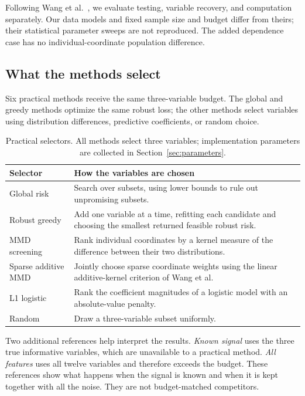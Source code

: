 \documentclass[11pt,a4paper]{article}
\begin{document}
Following Wang et al.~\cite{wang}, we evaluate testing, variable recovery, and
computation separately. Our data models and fixed sample size and budget differ
from theirs; their statistical parameter sweeps are not reproduced. The added
dependence case has no individual-coordinate population difference.

\subsection{What the methods select}
Six practical methods receive the same three-variable budget. The global and
greedy methods optimize the same robust loss; the other methods select variables
using distribution differences, predictive coefficients, or random choice.
\begin{table}[htbp]\centering\small
\caption{Practical selectors. All methods select three variables; implementation parameters are collected in Section~\ref{sec:parameters}.}\label{tab:selectors}
\begin{tabularx}{\linewidth}{@{}p{32mm}Y@{}}\toprule
Selector & How the variables are chosen\\\midrule
Global risk & Search over subsets, using lower bounds to rule out unpromising subsets.\\
Robust greedy & Add one variable at a time, refitting each candidate and choosing the smallest returned feasible robust risk.\\
MMD screening & Rank individual coordinates by a kernel measure of the difference between their two distributions.\\
Sparse additive MMD & Jointly choose sparse coordinate weights using the linear additive-kernel criterion of Wang et al.\\
L1 logistic & Rank the coefficient magnitudes of a logistic model with an absolute-value penalty.\\
Random & Draw a three-variable subset uniformly.\\\bottomrule
\end{tabularx}\end{table}
\FloatBarrier

Two additional references help interpret the results. \emph{Known signal} uses the
three true informative variables, which are unavailable to a practical method.
\emph{All features} uses all twelve variables and therefore exceeds the budget.
These references show what happens when the signal is known and when it is kept
together with all the noise. They are not budget-matched competitors.
\end{document}
